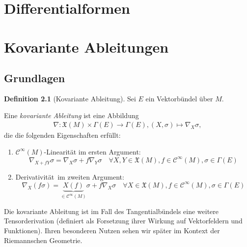 \documentclass[a4paper]{scrreprt}
\numberwithin{equation}{chapter}
\newcommand{\sC}{\mathcal{C}^{\infty}}
\newcommand{\vf}{\mathfrak{X}}
\theoremstyle{definition}
\newtheorem{defn}{Definition}[section]
\begin{document}
\chapter{Differentialformen}\label{chap:Differentialformen}


\chapter{Kovariante Ableitungen}
	\section{Grundlagen}
		\begin{defn}[Kovariante Ableitung]Sei $E$ ein Vektorbündel über $M$.
		
			Eine \emph{kovariante Ableitung} ist eine Abbildung
			\begin{align*}
				\nabla\colon \vf(M)\times\Gamma(E)\rightarrow\Gamma(E), (X,\sigma)\mapsto \nabla_X \sigma,
			\end{align*}
			die die folgenden Eigenschaften erfüllt:
			\begin{enumerate}[label=\arabic*]
				\item $\sC(M)$-Linearität im ersten Argument: 
				\begin{equation*}
					\nabla_{X+fY}\sigma=\nabla_X\sigma+f\nabla_Y \sigma\quad\forall X,Y\in\vf(M), f\in\sC(M),\sigma\in\Gamma(E)
				\end{equation*}
				\item \glqq Derivativität\grqq\ im zweiten Argument: 
				\begin{equation*}
					\nabla_X(f\sigma)=\underbrace{X(f)}_{\in\sC(M)} \sigma+f\nabla_X \sigma\quad\forall X\in\vf(M), f\in\sC(M),\sigma\in\Gamma(E)
				\end{equation*}
			\end{enumerate}
		\end{defn}
		Die kovariante Ableitung ist im Fall des Tangentialbündels eine weitere Tensorderivation (definiert als Forsetzung ihrer Wirkung auf Vektorfeldern und Funktionen). Ihren besonderen Nutzen sehen wir später im Kontext der Riemannschen Geometrie.
		
\end{document}
